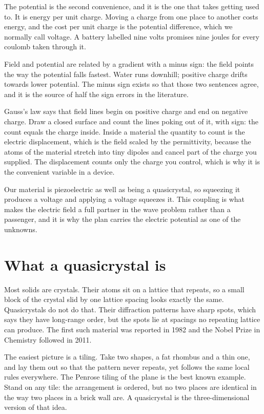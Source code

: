 \documentclass[11pt]{article}
\begin{document}
The potential is the second convenience, and it is the one that takes getting used to. It is energy per unit
charge. Moving a charge from one place to another costs energy, and the cost per unit charge is the potential
difference, which we normally call voltage. A battery labelled nine volts promises nine joules for every
coulomb taken through it.

Field and potential are related by a gradient with a minus sign: the field points the way the potential falls
fastest. Water runs downhill; positive charge drifts towards lower potential. The minus sign exists so that
those two sentences agree, and it is the source of half the sign errors in the literature.

Gauss's law says that field lines begin on positive charge and end on negative charge. Draw a closed surface
and count the lines poking out of it, with sign: the count equals the charge inside. Inside a material the
quantity to count is the electric displacement, which is the field scaled by the permittivity, because the
atoms of the material stretch into tiny dipoles and cancel part of the charge you supplied. The displacement
counts only the charge you control, which is why it is the convenient variable in a device.

Our material is piezoelectric as well as being a quasicrystal, so squeezing it produces a voltage and applying
a voltage squeezes it. This coupling is what makes the electric field a full partner in the wave problem
rather than a passenger, and it is why the plan carries the electric potential as one of the unknowns.

\section{What a quasicrystal is}

Most solids are crystals. Their atoms sit on a lattice that repeats, so a small block of the crystal slid by
one lattice spacing looks exactly the same. Quasicrystals do not do that. Their diffraction patterns have
sharp spots, which says they have long-range order, but the spots lie at spacings no repeating lattice can
produce. The first such material was reported in 1982 and the Nobel Prize in Chemistry followed in 2011.

The easiest picture is a tiling. Take two shapes, a fat rhombus and a thin one, and lay them out so that the
pattern never repeats, yet follows the same local rules everywhere. The Penrose tiling of the plane is the
best known example. Stand on any tile: the arrangement is ordered, but no two places are identical in the way
two places in a brick wall are. A quasicrystal is the three-dimensional version of that idea.
\end{document}
